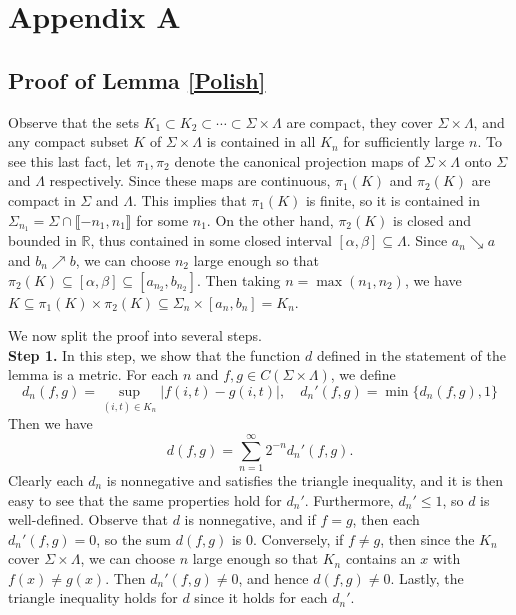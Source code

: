 %

\section{Appendix A} \label{Section8}

\subsection{Proof of Lemma \ref{Polish}}

Observe that the sets $K_1\subset K_2\subset\cdots\subset\Sigma\times\Lambda$ are compact, they cover $\Sigma\times\Lambda$, and any compact subset $K$ of $\Sigma\times\Lambda$ is contained in all $K_n$ for sufficiently large $n$. To see this last fact, let $\pi_1,\pi_2$ denote the canonical projection maps of $\Sigma\times\Lambda$ onto $\Sigma$ and $\Lambda$ respectively. Since these maps are continuous, $\pi_1(K)$ and $\pi_2(K)$ are compact in $\Sigma$ and $\Lambda$. This implies that $\pi_1(K)$ is finite, so it is contained in $\Sigma_{n_1} = \Sigma\cap\llbracket -n_1,n_1\rrbracket$ for some $n_1$. On the other hand, $\pi_2(K)$ is closed and bounded in $\mathbb{R}$, thus contained in some closed interval $[\alpha,\beta]\subseteq\Lambda$. Since $a_n\searrow a$ and $b_n\nearrow b$, we can choose $n_2$ large enough so that $\pi_2(K)\subseteq[\alpha,\beta]\subseteq[a_{n_2},b_{n_2}]$. Then taking $n=\max(n_1,n_2)$, we have $K \subseteq \pi_1(K) \times \pi_2(K) \subseteq \Sigma_n \times [a_n,b_n] = K_n$.

We now split the proof into several steps.\\

\noindent\textbf{Step 1.} In this step, we show that the function $d$ defined in the statement of the lemma is a metric. For each $n$ and $f,g\in C(\Sigma\times\Lambda)$, we define
\[
d_n(f,g) = \sup_{(i,t)\in K_n} |f(i,t)-g(i,t)|,\quad d_n'(f,g) = \min\{d_n(f,g), 1\} 
\]
Then we have
\[
d(f,g) = \sum_{n=1}^\infty 2^{-n} d_n'(f,g).
\]
Clearly each $d_n$ is nonnegative and satisfies the triangle inequality, and it is then easy to see that the same properties hold for $d_n'$. Furthermore, $d_n'\leq 1$, so $d$ is well-defined. Observe that $d$ is nonnegative, and if $f=g$, then each $d_n'(f,g)=0$, so the sum $d(f,g)$ is 0. Conversely, if $f\neq g$, then since the $K_n$ cover $\Sigma\times\Lambda$, we can choose $n$ large enough so that $K_n$ contains an $x$ with $f(x)\neq g(x)$. Then $d_n'(f,g)\neq 0$, and hence $d(f,g)\neq 0$. Lastly, the triangle inequality holds for $d$ since it holds for each $d_n'$.\\

